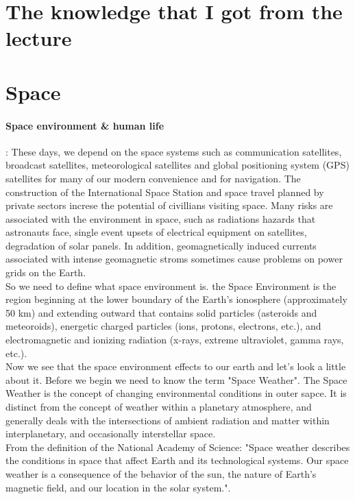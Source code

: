\section*{The knowledge that I got from the lecture}
\section*{Space}
\paragraph*{Space environment \& human life}: These days, we depend on the space systems such as communication satellites, broadcast satellites, meteorological satellites and global positioning system (GPS) satellites for many of our modern convenience and for navigation. The construction of the International Space Station and space travel planned by private sectors increse the potential of civillians visiting space. Many risks are associated with the environment in space, such as radiations hazards that astronauts face, single event upsets of electrical equipment on satellites, degradation of solar panels. In addition, geomagnetically induced currents associated with intense geomagnetic stroms sometimes cause problems on power grids on the Earth\cite{lecture}.\\
So we need to define what space environment is. the Space Environment is the region beginning at the lower boundary of the Earth's ionosphere (approximately 50 km) and extending outward that contains solid particles (asteroids and meteoroids), energetic charged particles (ions, protons, electrons, etc.), and electromagnetic and ionizing radiation (x-rays, extreme ultraviolet, gamma rays, etc.).\\
Now we see that the space environment effects to our earth and let's look a little about it. Before we begin we need to know the term "Space Weather". The Space Weather is the concept of changing environmental conditions in outer sapce. It is distinct from the concept of weather within a planetary atmosphere, and generally deals with the intersections of ambient radiation and matter within interplanetary, and occasionally interstellar space\cite{www.thefreedictionary.com2018}.\\
From the definition of the National Academy of Science: "Space weather describes the conditions in space that affect Earth and its technological systems. Our space weather is a consequence of the behavior of the sun, the nature of Earth's magnetic field, and our location in the solar system."\cite{lecture}.\\
